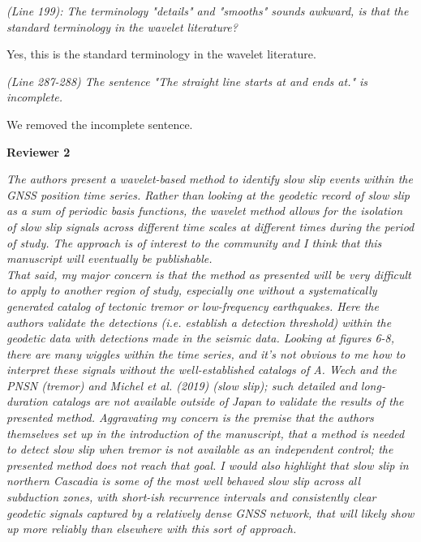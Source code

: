 \documentclass[letterpaper, 12pt]{article}
\begin{document}
\bigskip

\textit{(Line 199): The terminology "details" and "smooths" sounds awkward, is that the standard terminology in the wavelet literature?}

\bigskip

Yes, this is the standard terminology in the wavelet literature.

\bigskip

\textit{(Line 287-288) The sentence "The straight line starts at and ends at." is incomplete.}

\bigskip

We removed the incomplete sentence.

\bigskip

\textbf{Reviewer 2}

\bigskip

\textit{The authors present a wavelet-based method to identify slow slip events within the GNSS position time series. Rather than looking at the geodetic record of slow slip as a sum of periodic basis functions, the wavelet method allows for the isolation of slow slip signals across different time scales at different times during the period of study. The approach is of interest to the community and I think that this manuscript will eventually be publishable.} \\

\textit{That said, my major concern is that the method as presented will be very difficult to apply to another region of study, especially one without a systematically generated catalog of tectonic tremor or low-frequency earthquakes. Here the authors validate the detections (i.e. establish a detection threshold) within the geodetic data with detections made in the seismic data. Looking at figures 6-8, there are many wiggles within the time series, and it's not obvious to me how to interpret these signals without the well-established catalogs of A. Wech and the PNSN (tremor) and Michel et al. (2019) (slow slip); such detailed and long-duration catalogs are not available outside of Japan to validate the results of the presented method. Aggravating my concern is the premise that the authors themselves set up in the introduction of the manuscript, that a method is needed to detect slow slip when tremor is not available as an independent control; the presented method does not reach that goal. I would also highlight that slow slip in northern Cascadia is some of the most well behaved slow slip across all subduction zones, with short-ish recurrence intervals and consistently clear geodetic signals captured by a relatively dense GNSS network, that will likely show up more reliably than elsewhere with this sort of approach.}
\end{document}
